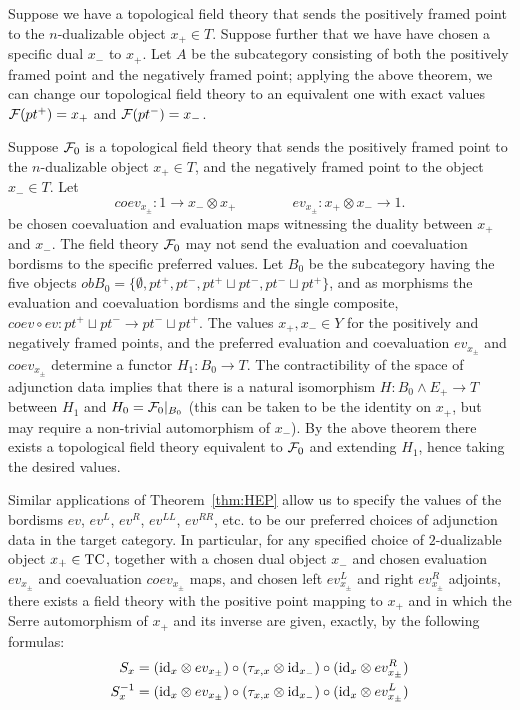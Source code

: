 \documentclass{amsart}
\begin{document}
\begin{example}	
	Suppose we have a topological field theory that sends the positively framed point to the $n$-dualizable object $x_+ \in T$. Suppose further that we have have chosen a specific dual $x_-$ to $x_+$. Let $A$ be the subcategory consisting of both the positively framed point and the negatively framed point; applying the above theorem, we can change our topological field theory to an equivalent one with exact values $\mathcal F(pt^+) = x_+$ and $\mathcal F(pt^-) = x_-$.   
\end{example}	

\begin{example}
	Suppose $\mathcal F_0$ is a topological field theory that sends the positively framed point to the $n$-dualizable object $x_+ \in T$, and the negatively framed point to the object $x_- \in T$.  Let 
\begin{equation*}
	coev_{x_\pm}: 1 \to x_- \otimes x_+ \qquad \qquad ev_{x_\pm}: x_+ \otimes x_- \to 1.
\end{equation*}	
be chosen coevaluation and evaluation maps witnessing the duality between $x_+$ and $x_-$. The field theory $\mathcal F_0$ may not send the evaluation and coevaluation bordisms to the specific preferred values.  Let $B_0$ be the subcategory having the five objects $ob B_0 = \{ \emptyset, pt^+, pt^-, pt^+ \sqcup pt^-, pt^- \sqcup pt^+ \}$, and as morphisms the evaluation and coevaluation bordisms and the single composite, $coev \circ ev: pt^+ \sqcup pt^- \to pt^- \sqcup pt^+$.  The values $x_+, x_- \in Y$ for the positively and negatively framed points, and the preferred evaluation and coevaluation $ev_{x_\pm}$ and $coev_{x_\pm}$ determine a functor $H_1: B_0 \to T$. The contractibility of the space of adjunction data implies that there is a natural isomorphism $H: B_0 \wedge E_+ \to T$ between $H_1$ and $H_0 = \mathcal F_0|_{B_0}$ (this can be taken to be the identity on $x_+$, but may require a non-trivial automorphism of $x_-$). By the above theorem there exists a topological field theory equivalent to $\mathcal F_0$ and extending $H_1$, hence taking the desired values. 
\end{example}

Similar applications of Theorem~\ref{thm:HEP} allow us to specify the values of the bordisms $ev$, $ev^L$, $ev^R$, $ev^{LL}$, $ev^{RR}$, etc. to be our preferred choices of adjunction data in the target category.  In particular, for any specified choice of $2$-dualizable object $x_+ \in \mathrm{TC}$, together with a chosen dual object $x_-$ and chosen evaluation $ev_{x_\pm}$ and coevaluation $coev_{x_\pm}$ maps, and chosen left $ev_{x_\pm}^L$ and right $ev_{x_\pm}^R$ adjoints, there exists a field theory with the positive point mapping to $x_+$ and in which the Serre automorphism of $x_+$ and its inverse are given, exactly, by the following formulas:
	\begin{align*}
		S_x &= (\mathrm{id}_{x} \otimes ev_{x_\pm}) \circ (\tau_{x, x} \otimes \mathrm{id}_{x_-}) \circ (\mathrm{id}_{x} \otimes ev_{x_\pm}^R) \\
		S_x^{-1} &= (\mathrm{id}_{x} \otimes ev_{x_\pm}) \circ (\tau_{x, x} \otimes \mathrm{id}_{x_-}) \circ (\mathrm{id}_{x} \otimes ev_{x_\pm}^L)
	\end{align*}
 
\end{document}
